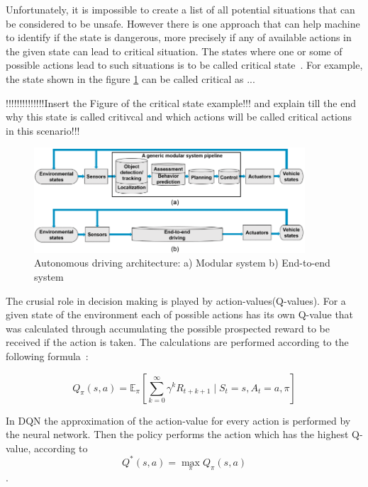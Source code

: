 Unfortunately, it is impossible to create a list of all potential situations that can be considered to be unsafe. However there is one approach that can help machine to identify if the state is dangerous, more precisely if any of available actions in the given state can lead to critical situation. The states where one or some of possible actions lead to such situations is to be called critical state~\cite{criticality2019}. For example, the state shown in the figure \ref{fig:ad_architercture} can be called critical as ...


!!!!!!!!!!!!!!Insert the Figure of the critical state example!!! and explain till the end why this state is called critivcal and which actions will be called critical actions in this scenario!!!

\begin{figure}[!h]
	\centering
	\includegraphics[width={0.9\textwidth}]{images/AD_architecture.png}
	\caption{Autonomous driving architecture: a) Modular system b) End-to-end system \cite{ad_pipeline}}
	\label{fig:ad_architercture}	
\end{figure}


The crusial role in decision making is played by action-values(Q-values). For a given state of the environment each of possible actions has its own Q-value that was calculated through accumulating the possible prospected reward to be received if the action is taken. The calculations are performed according to the following formula~\cite{xue2023dvqn}:

\[
Q_\pi(s, a) = \mathbb{E}_\pi \left[ \sum_{k=0}^\infty \gamma^k R_{t+k+1} \mid S_t = s, A_t = a, \pi \right]
\]

In DQN the approximation of the action-value for every action is performed by the neural network. Then the policy performs the action which has the highest Q-value, according to \[Q^*(s, a) = \max_\pi Q_\pi(s, a)\]. 

